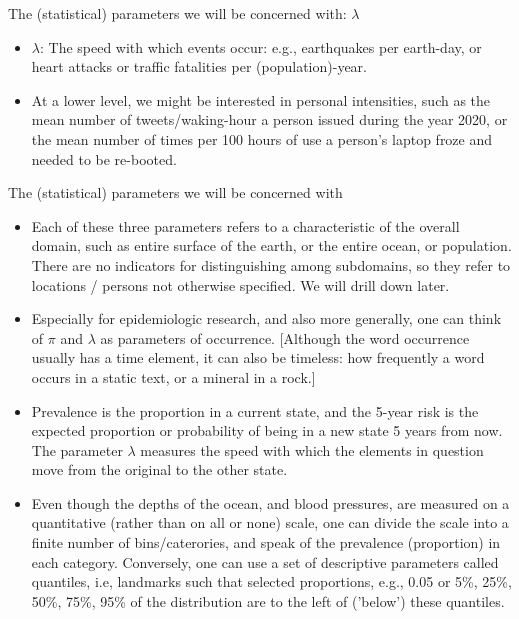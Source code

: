 \documentclass[10pt]{beamer}\usepackage[]{graphicx}\usepackage[]{color}
\begin{document}
\begin{frame}{The (statistical) parameters we will be concerned with: $\lambda$}
	
	
	\begin{itemize}
			
		\item $\lambda$: The speed with which events occur: e.g., earthquakes per earth-day, or heart attacks or traffic fatalities per (population)-year. 
		\item At a lower level, we might be interested in personal intensities, such as the mean number of tweets/waking-hour  a person issued during the year 2020, or the mean number of times per 100 hours of use a person's laptop froze and needed to be re-booted.
		
	\end{itemize}
	
\end{frame}



\begin{frame}{The (statistical) parameters we will be concerned with}
	
	
	\begin{itemize}
		\item Each of these three parameters refers to a characteristic of the overall domain, such as entire surface of the earth, or the entire ocean, or population. There are no indicators for distinguishing among subdomains, so they refer to locations / persons not otherwise specified. We will drill down  later. \pause 
		
		\item Especially for epidemiologic research, and also more generally, one can think  of $\pi$ and $\lambda$ as  parameters of occurrence. [Although the word occurrence usually has a time element, it can also be timeless: how frequently a word occurs in a static text, or a mineral in a rock.] \pause 
		
		\item Prevalence is the proportion in a current state, and the 5-year risk is the expected proportion or probability of being in a new state 5 years from now. The  parameter $\lambda$ measures the speed with which the  elements in question move from the original to the other state.\pause 
		
		\item Even though the depths of the ocean, and blood pressures, are measured on a quantitative (rather than on all or none) scale, one can divide the scale into a finite number of bins/caterories, and speak of the prevalence (proportion) in each category. Conversely, one can use a set of descriptive parameters called quantiles, i.e, landmarks such that selected proportions, e.g., 0.05 or 5\%, 25\%, 50\%, 75\%, 95\% of the distribution are to the left of ('below') these quantiles.
	\end{itemize}
	
\end{frame}
\end{document}
